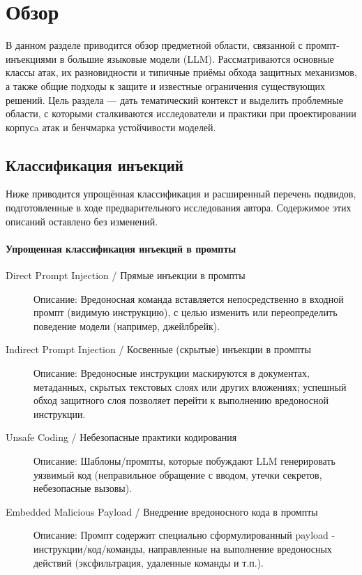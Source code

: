 
\section{Обзор}
\label{sec:relatedworks}

В данном разделе приводится обзор предметной области, связанной с промпт-инъекциями в большие языковые модели (LLM). Рассматриваются основные классы атак, их разновидности и типичные приёмы обхода защитных механизмов, а также общие подходы к защите и известные ограничения существующих решений. Цель раздела --- дать тематический контекст и выделить проблемные области, с которыми сталкиваются исследователи и практики при проектировании корпусa атак и бенчмарка устойчивости моделей.

\subsection{Классификация инъекций}

Ниже приводится упрощённая классификация и расширенный перечень подвидов, подготовленные в ходе предварительного исследования автора. Содержимое этих описаний оставлено без изменений.

\paragraph{Упрощенная классификация инъекций в промпты}

\begin{description}
  \item[Direct Prompt Injection / Прямые инъекции в промпты]
  Описание: Вредоносная команда вставляется непосредственно в входной промпт (видимую инструкцию), с целью изменить или переопределить поведение модели (например, джейлбрейк).

  \item[Indirect Prompt Injection / Косвенные (скрытые) инъекции в промпты]
  Описание: Вредоносные инструкции маскируются в документах, метаданных, скрытых текстовых слоях или других вложениях; успешный обход защитного слоя позволяет перейти к выполнению вредоносной инструкции.

  \item[Unsafe Coding / Небезопасные практики кодирования]
  Описание: Шаблоны/промпты, которые побуждают LLM генерировать уязвимый код (неправильное обращение с вводом, утечки секретов, небезопасные вызовы).

  \item[Embedded Malicious Payload / Внедрение вредоносного кода в промпты]
  Описание: Промпт содержит специально сформулированный payload - инструкции/код/команды, направленные на выполнение вредоносных действий (эксфильтрация, удаленные команды и т.п.).
\end{description}

